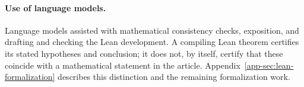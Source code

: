 \documentclass{article}
\theoremstyle{plain}
\begin{document}
\paragraph{Use of language models.}
Language models assisted with mathematical consistency checks, exposition, and drafting and checking the Lean development. A compiling Lean theorem certifies its stated hypotheses and conclusion; it does not, by itself, certify that these coincide with a mathematical statement in the article. Appendix~\ref{app-sec:lean-formalization} describes this distinction and the remaining formalization work.


\clearpage
\appendix









\end{document}
